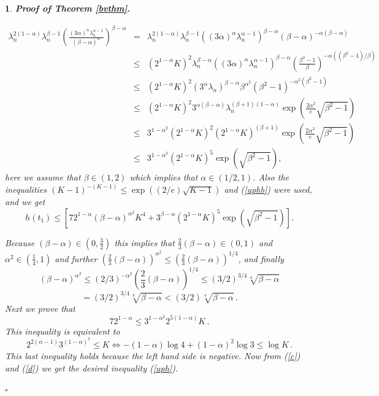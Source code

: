 \documentclass[12pt,a4paper,leqno]{amsart}
\theoremstyle{plain}
\newtheorem{subsec}[equation]{}
\numberwithin{equation}{section}          %
\begin{document}
\begin{subsec} {\bf Proof of Theorem \ref{bvthm}.}
{\begin{eqnarray*}
\lambda_n^{2(1-\alpha)}\lambda_n^{\beta-1} \left(\frac{(3 \alpha)^\alpha \lambda_n^{\alpha-1}}{(\beta-\alpha)^{\alpha} }\right) ^{\beta-\alpha}
&=&\lambda_n^{2(1-\alpha)}\lambda_n^{\beta-1}\left((3 \alpha)^\alpha \lambda_n^{\alpha-1}\right)^{\beta-\alpha}(\beta-\alpha)^{-\alpha(\beta-\alpha)}\\
&\leq &(2^{1-\alpha}K)^2\lambda_n^{\beta-\alpha}\left((3 \alpha)^\alpha \lambda_n^{\alpha-1}\right)^{\beta-\alpha}
\left(\frac{\beta^2-1}{\beta}\right)^{-\alpha((\beta^2-1)/\beta)}\\
&\leq &(2^{1-\alpha}K)^2\left(3 ^\alpha \lambda_n\right)^{\beta-\alpha}\beta^{\alpha^2}(\beta^2-1)^{-\alpha^2(\beta^2-1)}\\
&\leq &(2^{1-\alpha}K)^2  3^ {\alpha(\beta-\alpha)} \lambda_n^{(\beta+1)(1-\alpha)}\exp\left(\frac{2\alpha^2}{e}\sqrt{\beta^2-1}\right)\\
&\leq &3^{1-\alpha^2}(2^{1-\alpha}K)^2 (2^{1-\alpha}K)^{(\beta+1)}\exp\left(\frac{2\alpha^2}{e}\sqrt{\beta^2-1}\right)\\
&\leq &3^{1-\alpha^2}(2^{1-\alpha}K)^5\exp(\sqrt{\beta^2-1}),
\end{eqnarray*}
here we assume that $\beta\in(1,2)$ which implies that
$\alpha\in(1/2,1)$. Also the inequalities
$(K-1)^{-(K-1)}\leq\exp((2/e)\sqrt{K-1})$ and (\ref{uphb}) were
used, and we get
\begin{equation}\label{c}
h(t_1)\leq\left[ 72^{1-\alpha}(\beta-\alpha)^{\alpha^2}K^4+3^{\beta-\alpha}(2^{1-\alpha}K)^5\exp(\sqrt{\beta^2-1})\right].
\end{equation}

Because $(\beta-\alpha)\in(0,\frac{3}{2})$ this implies that
$\frac{2}{3}(\beta-\alpha)\in(0,1)$ and $\alpha^2\in(\frac{1}{4},1)$
and further $(\frac{2}{3}(\beta-\alpha))^ {\alpha^2}\leq
(\frac{2}{3}(\beta-\alpha))^{1/4}$, and finally
$$(\beta-\alpha)^
{\alpha^2}\leq(2/3)^{-\alpha^2}(\frac{2}{3}(\beta-\alpha))^
{1/4}\leq (3/2)^{3/4}\sqrt[4]{\beta-\alpha}$$
$$=(3/2)^{3/4}\sqrt[4]{\beta-\alpha}<(3/2)\sqrt[4]{\beta-\alpha}\,.$$
Next we prove that
\begin{equation} \label{d}
72^{1-\alpha}\leq 3^{1-\alpha^2}2^{5(1-\alpha)}K\,.
\end{equation}
This inequality is equivalent to
$$2^{2(\alpha-1)}3^{(1-\alpha)^2}\leq K\Longleftrightarrow -(1-\alpha)\log 4+(1-\alpha)^2\log 3\leq \log K\,.$$
This last inequality holds because the left hand side is negative.
Now from (\ref{c}) and (\ref{d}) we get the desired inequality (\ref{uph}). } $\square$
\end{subsec}
\end{document}
